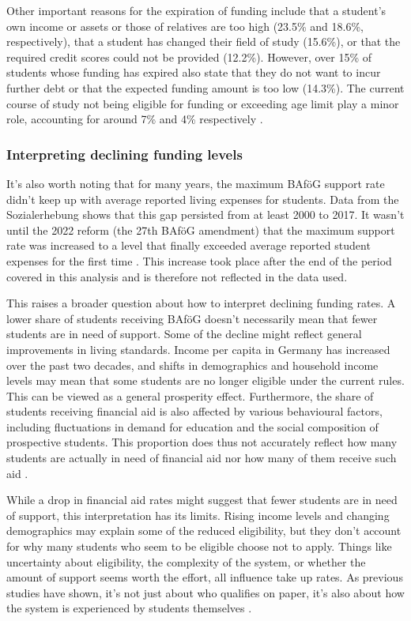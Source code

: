 Other important reasons for the expiration of funding include that a student's own income or assets or those of relatives are too high (23.5\% and 18.6\%, respectively), that a student has changed their field of study (15.6\%), or that the required credit scores could not be provided (12.2\%). However, over 15\% of students whose funding has expired also state that they do not want to incur further debt or that the expected funding amount is too low (14.3\%). The current course of study not being eligible for funding or exceeding age limit play a minor role, accounting for around 7\% and 4\% respectively \citep{kroher_studierendenbefragung_2023}.

\subsubsection*{Interpreting declining funding levels}
\label{subsection:interpreting-declining-funding-levels}

It’s also worth noting that for many years, the maximum BAföG support rate didn’t keep up with average reported living expenses for students. Data from the Sozialerhebung shows that this gap persisted from at least 2000 to 2017. It wasn’t until the 2022 reform (the 27th BAföG amendment) that the maximum support rate was increased to a level that finally exceeded average reported student expenses for the first time \citep{meier_bafog_2024, meier_zur_2024}. This increase took place after the end of the period covered in this analysis and is therefore not reflected in the data used.

This raises a broader question about how to interpret declining funding rates. A lower share of students receiving BAföG doesn’t necessarily mean that fewer students are in need of support. Some of the decline might reflect general improvements in living standards. Income per capita in Germany has increased over the past two decades, and shifts in demographics and household income levels may mean that some students are no longer eligible under the current rules. This can be viewed as a general prosperity effect. Furthermore, the share of students receiving financial aid is also affected by various behavioural factors, including fluctuations in demand for education and the social composition of prospective students. This proportion does thus not accurately reflect how many students are actually in need of financial aid nor how many of them receive such aid \citep{meier_bafog_2024, meier_zur_2024}.

While a drop in financial aid rates might suggest that fewer students are in need of support, this interpretation has its limits. Rising income levels and changing demographics may explain some of the reduced eligibility, but they don't account for why many students who seem to be eligible choose not to apply. Things like uncertainty about eligibility, the complexity of the system, or whether the amount of support seems worth the effort, all influence take up rates. As previous studies have shown, it’s not just about who qualifies on paper, it’s also about how the system is experienced by students themselves \citep{meier_bafog_2024, meier_zur_2024}.

